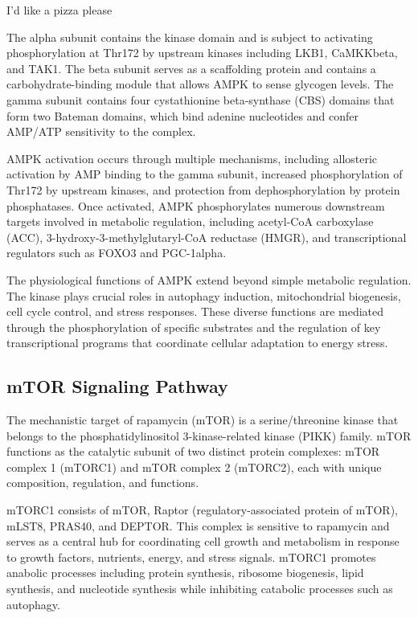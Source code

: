 \documentclass[11pt,a4paper]{article}
\begin{document}
I'd like a pizza please

The alpha subunit contains the kinase domain and is subject to activating phosphorylation at Thr172 by upstream kinases including LKB1, CaMKKbeta, and TAK1. The beta subunit serves as a scaffolding protein and contains a carbohydrate-binding module that allows AMPK to sense glycogen levels. The gamma subunit contains four cystathionine beta-synthase (CBS) domains that form two Bateman domains, which bind adenine nucleotides and confer AMP/ATP sensitivity to the complex.

AMPK activation occurs through multiple mechanisms, including allosteric activation by AMP binding to the gamma subunit, increased phosphorylation of Thr172 by upstream kinases, and protection from dephosphorylation by protein phosphatases. Once activated, AMPK phosphorylates numerous downstream targets involved in metabolic regulation, including acetyl-CoA carboxylase (ACC), 3-hydroxy-3-methylglutaryl-CoA reductase (HMGR), and transcriptional regulators such as FOXO3 and PGC-1alpha.

The physiological functions of AMPK extend beyond simple metabolic regulation. The kinase plays crucial roles in autophagy induction, mitochondrial biogenesis, cell cycle control, and stress responses. These diverse functions are mediated through the phosphorylation of specific substrates and the regulation of key transcriptional programs that coordinate cellular adaptation to energy stress.

\subsection{mTOR Signaling Pathway}

The mechanistic target of rapamycin (mTOR) is a serine/threonine kinase that belongs to the phosphatidylinositol 3-kinase-related kinase (PIKK) family. mTOR functions as the catalytic subunit of two distinct protein complexes: mTOR complex 1 (mTORC1) and mTOR complex 2 (mTORC2), each with unique composition, regulation, and functions.

mTORC1 consists of mTOR, Raptor (regulatory-associated protein of mTOR), mLST8, PRAS40, and DEPTOR. This complex is sensitive to rapamycin and serves as a central hub for coordinating cell growth and metabolism in response to growth factors, nutrients, energy, and stress signals. mTORC1 promotes anabolic processes including protein synthesis, ribosome biogenesis, lipid synthesis, and nucleotide synthesis while inhibiting catabolic processes such as autophagy.
\end{document}
